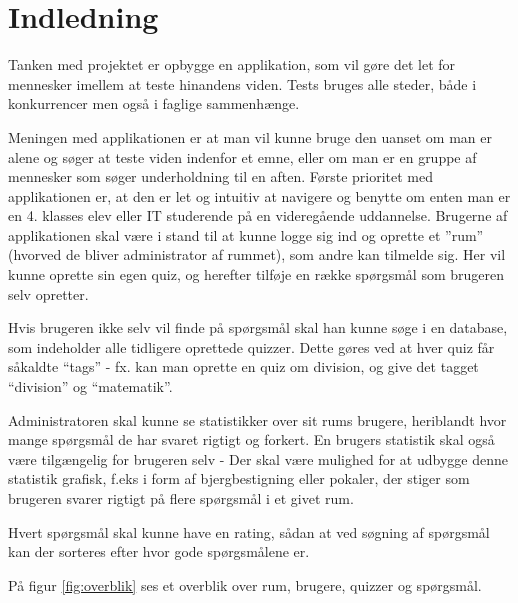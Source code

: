 \chapter{Indledning}
Tanken med projektet er opbygge en applikation, som vil gøre det let for mennesker imellem at teste hinandens viden. Tests bruges alle steder, både i konkurrencer men også i faglige sammenhænge. 

Meningen med applikationen er at man vil kunne bruge den uanset om man er alene og søger at teste viden indenfor et emne, eller om man er en gruppe af mennesker som søger underholdning til en aften. 
Første prioritet med applikationen er, at den er let og intuitiv at navigere og benytte om enten man er en 4. klasses elev eller IT studerende på en videregående uddannelse. 
Brugerne af applikationen skal være i stand til at kunne logge sig ind og oprette et ''rum'' (hvorved de bliver administrator af rummet), som andre kan tilmelde sig. Her vil kunne oprette sin egen quiz, og herefter tilføje en række spørgsmål som brugeren selv opretter. 

Hvis brugeren ikke selv vil finde på spørgsmål skal han kunne søge i en database, som indeholder alle tidligere oprettede quizzer. Dette gøres ved at hver quiz får såkaldte “tags” - fx. kan man oprette en quiz om division, og give det tagget “division” og “matematik”. 

Administratoren skal kunne se statistikker over sit rums brugere, heriblandt hvor mange spørgsmål de har svaret rigtigt og forkert. En brugers statistik skal også være tilgængelig for brugeren selv - Der skal være mulighed for at udbygge denne statistik grafisk, f.eks i form af bjergbestigning eller pokaler, der stiger som brugeren svarer rigtigt på flere spørgsmål i et givet rum.

Hvert spørgsmål skal kunne have en rating, sådan at ved søgning af spørgsmål kan der sorteres efter hvor gode spørgsmålene er.

På figur \ref{fig:overblik} ses et overblik over rum, brugere, quizzer og spørgsmål.

